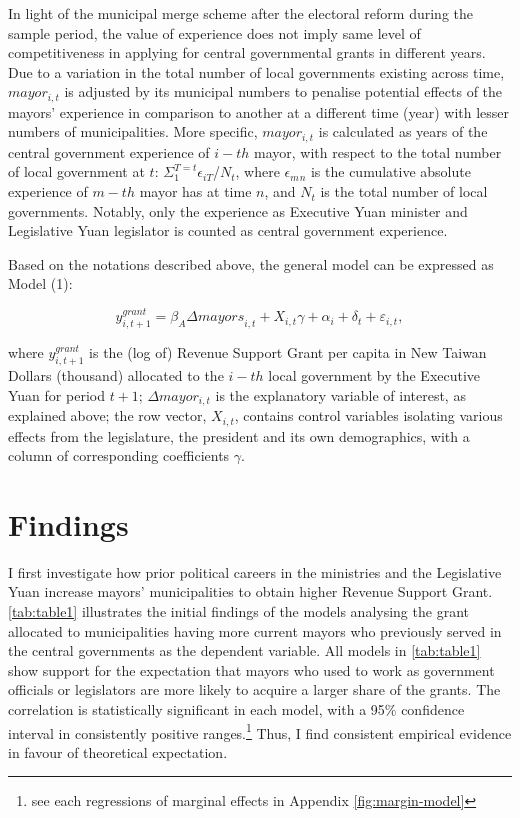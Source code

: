 In light of the municipal merge scheme after the electoral reform during the sample period, the value of experience does not imply same level of competitiveness in applying for central governmental grants in different years. Due to a variation in the total number of local governments existing across time, $mayor_{i,t}$ is adjusted by its municipal numbers to penalise potential effects of the mayors' experience in comparison to another at a different time (year) with lesser numbers of municipalities. More specific, $mayor_{i,t}$ is calculated as years of the central government experience of $i-th$ mayor, with respect to the total number of local government at $t$: $\Sigma_{1}^{T=t}\epsilon_{iT}$/$N_t$, where $\epsilon_m{}_n$ is the cumulative absolute experience of $m-th$ mayor has at time $n$, and $N_t$ is the total number of local governments. Notably, only the experience as Executive Yuan minister and Legislative Yuan legislator is counted as central government experience.

Based on the notations described above, the general model can be expressed
as Model (1):

\begin{equation} \ensuremath{y_{i,t+1}^{grant}}=\ensuremath{\beta_{A}{\Delta mayors}_{i,t} + X_{i,t}\gamma + \alpha_{i} + \delta_{t} + \varepsilon_{i,t}},\end{equation}

where $y_{i,t+1}^{grant}$ is the (log of) Revenue Support Grant per capita in New Taiwan Dollars (thousand) allocated to the $i-th$ local government by the Executive Yuan for period $t+1$; $\Delta mayor_{i,t}$ is the explanatory variable of interest, as explained above; the row vector, $X_{i,t}$, contains control variables isolating various effects from the legislature, the president and its own demographics, with
a column of corresponding coefficients $\gamma$. 



\section*{\centering Findings}
I first investigate how prior political careers in the ministries and the Legislative Yuan increase mayors' municipalities to obtain higher Revenue Support Grant. \autoref{tab:table1} illustrates the initial findings of the models analysing the grant allocated to municipalities having more current mayors who previously served in the central governments as the dependent variable. All models in \autoref{tab:table1} show support for the expectation that mayors who used to work as government officials or legislators are more likely to acquire a larger share of the grants. The correlation is statistically significant in each model, with a 95\% confidence interval in consistently positive ranges.\footnote{see each regressions of marginal effects in Appendix \ref{fig:margin-model} } Thus, I find consistent empirical evidence in favour of theoretical expectation.

